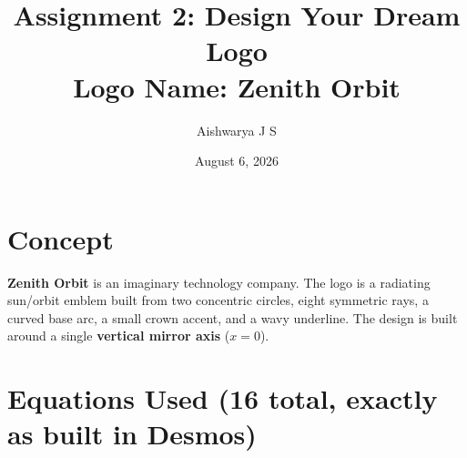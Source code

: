 \documentclass[11pt]{article}
\title{Assignment 2: Design Your Dream Logo \\ \large Logo Name: \textbf{Zenith Orbit}}
\author{Aishwarya J S}
\date{August 6, 2026}
\begin{document}
\maketitle

\section*{Concept}
\textbf{Zenith Orbit} is an imaginary technology company. The logo is a radiating
sun/orbit emblem built from two concentric circles, eight symmetric rays, a curved
base arc, a small crown accent, and a wavy underline. The design is built around a
single \textbf{vertical mirror axis} ($x=0$).

\section*{Equations Used (16 total, exactly as built in Desmos)}
\end{document}
